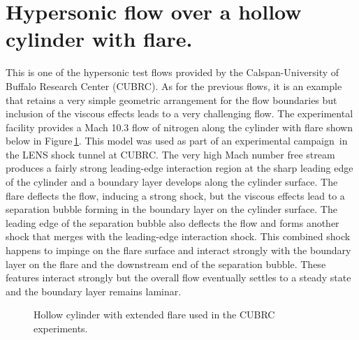 
\section{Hypersonic flow over a hollow cylinder with flare.}
\label{sec:cylinder-flare}
%
This is one of the hypersonic test flows provided by the Calspan-University of Buffalo Research Center (CUBRC).
As for the previous flows, it is an example that retains a very simple
geometric arrangement for the flow boundaries but inclusion of the viscous effects 
leads to a very challenging flow.
The experimental facility provides a Mach 10.3 flow of nitrogen along the cylinder with flare shown below 
in Figure\,\ref{fig:cylinder-flare-model}.
This model was used as part of an experimental campaign\,\cite{holden_etal_2002a,holden_wadhams_2003a} 
in the LENS shock tunnel at CUBRC.
The very high Mach number free stream produces a fairly strong leading-edge interaction region
at the sharp leading edge of the cylinder and a boundary layer develops along the cylinder surface.
The flare deflects the flow, inducing a strong shock, but the viscous effects lead to a separation 
bubble forming in the boundary layer on the cylinder surface.
The leading edge of the separation bubble also deflects the flow and forms another shock that
merges with the leading-edge interaction shock.
This combined shock happens to impinge on the flare surface and interact strongly with the boundary layer 
on the flare and the downstream end of the separation bubble.
These features interact strongly but the overall flow eventually settles to a steady state and the boundary
layer remains laminar.

\begin{figure}[htbp]
 \centering
 \caption{Hollow cylinder with extended flare used in the CUBRC experiments.}
 \label{fig:cylinder-flare-model}
\end{figure}

